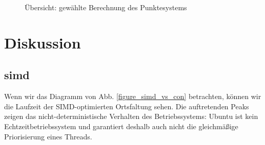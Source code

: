 \documentclass[a4paper,12pt]{article}
\begin{document}
\begin{figure}[htbp]
\caption{Übersicht: gewählte Berechnung des Punktesystems}%
\label{figure_konv_subimage}
\end{figure}

\section{Diskussion}
\subsection{simd}
Wenn wir das Diagramm von Abb. \ref{figure_simd_vs_con} betrachten, können wir
die Laufzeit der SIMD-optimierten Ortsfaltung sehen. Die auftretenden Peaks
zeigen das nicht-deterministische Verhalten des Betriebssystems: Ubuntu ist kein
Echtzeitbetriebssystem und garantiert deshalb auch nicht die gleichmäßige
Priorisierung eines Threads. 
\end{document}

